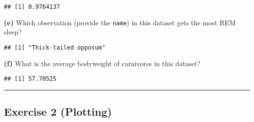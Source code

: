 \documentclass[]{article}
\newenvironment{Shaded}{\begin{snugshade}}{\end{snugshade}}
\newcommand{\DataTypeTok}[1]{\textcolor[rgb]{0.13,0.29,0.53}{#1}}
\newcommand{\KeywordTok}[1]{\textcolor[rgb]{0.13,0.29,0.53}{\textbf{#1}}}
\newcommand{\NormalTok}[1]{#1}
\newcommand{\OperatorTok}[1]{\textcolor[rgb]{0.81,0.36,0.00}{\textbf{#1}}}
\newcommand{\OtherTok}[1]{\textcolor[rgb]{0.56,0.35,0.01}{#1}}
\newcommand{\StringTok}[1]{\textcolor[rgb]{0.31,0.60,0.02}{#1}}
\begin{document}
\begin{Shaded}
\end{Shaded}

\begin{verbatim}
## [1] 0.9764137
\end{verbatim}

\textbf{(e)} Which observation (provide the \texttt{name}) in this
dataset gets the most REM sleep?

\begin{Shaded}
\end{Shaded}

\begin{verbatim}
## [1] "Thick-tailed opposum"
\end{verbatim}

\textbf{(f)} What is the average bodyweight of carnivores in this
dataset?

\begin{Shaded}
\end{Shaded}

\begin{verbatim}
## [1] 57.70525
\end{verbatim}

\begin{center}\rule{0.5\linewidth}{0.5pt}\end{center}

\hypertarget{exercise-2-plotting}{%
\subsection{Exercise 2 (Plotting)}\label{exercise-2-plotting}}
\end{document}
